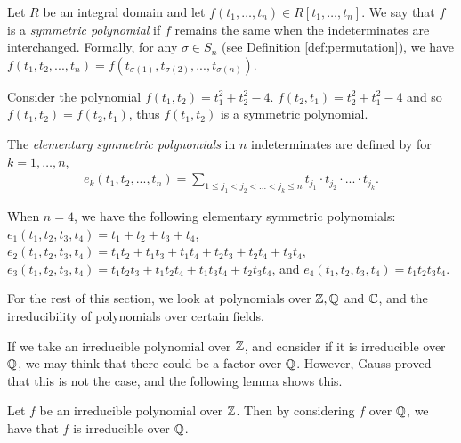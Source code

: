 \begin{definition}
	Let $R$ be an integral domain and let $f(t_1, \dots, t_n) \in R[t_1, \dots, t_n]$. We say that $f$ is
    a \textit{symmetric polynomial} if $f$ remains the same when the indeterminates are interchanged. 
    Formally, for any $\sigma \in S_n$ (see Definition \ref{def:permutation}), we have $f(t_1,t_2,...,t_n) = f(t_{\sigma(1)},t_{\sigma(2)},...,t_{\sigma(n)})$.
\end{definition}

\begin{example}
    Consider the polynomial 
    $f(t_1,t_2)=t_1^2+t_2^2-4$. $f(t_2,t_1)=t_2^2+t_1^2-4$ and so $f(t_1,t_2)=f(t_2,t_1)$, thus $f(t_1,t_2)$ is a symmetric polynomial.
\end{example}

\begin{definition}
    The \textit{elementary symmetric polynomials} in $n$ indeterminates are defined by for $k = 1, \dots, n$,
    \begin{align*}
    e_k(t_1,t_2,...,t_n) = \sum_{1\leq j_1<j_2<...<j_k\leq n} t_{j_1}\cdot t_{j_2} \cdot ... \cdot t_{j_k}.
    \end{align*}
\end{definition}

\begin{example}
    When $n=4$, we have the following elementary symmetric polynomials: $e_1(t_1,t_2,t_3,t_4) = t_1 + t_2 + t_3 + t_4$, $e_2(t_1, t_2, t_3, t_4) = t_1t_2 + t_1t_3 + t_1t_4 + t_2t_3 + t_2t_4 + t_3t_4$,  $e_3(t_1,t_2,t_3,t_4) = t_1t_2t_3+t_1t_2t_4+t_1t_3t_4+t_2t_3t_4$, and $e_4(t_1, t_2, t_3, t_4) = t_1 t_2 t_3 t_4$. 
\end{example}

For the rest of this section, we look at polynomials over $\mathbb Z, \mathbb Q$ and $\mathbb C$, and the irreducibility of polynomials over certain fields.

If we take an irreducible polynomial over $\mathbb Z$, and consider if it is irreducible over $\mathbb Q$, we may think that there could be a factor over $\mathbb Q$. However, Gauss proved that this is not the case, and the following lemma shows this.

\begin{lemma} \label{lemma:gauss}
     Let $f$ be an irreducible polynomial over $\mathbb Z$. Then by considering $f$ over $\mathbb Q$, we have that $f$ is irreducible over $\mathbb Q$.
\end{lemma}


